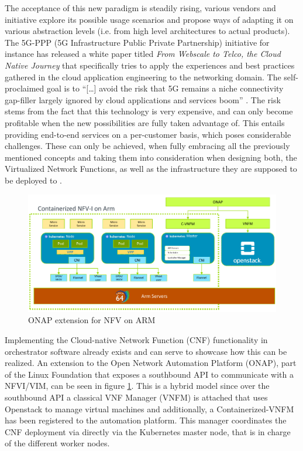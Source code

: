 The acceptance of this new paradigm is steadily rising, various vendors and initiative explore its possible usage scenarios and propose ways of adapting it on various abstraction levels (i.e. from high level architectures to actual products). 
The 5G-PPP (5G Infrastructure Public Private Partnership) initiative for instance has released a white paper titled \textit{From Webscale to Telco, the Cloud Native Journey} \cite{5gppp} that specifically tries to apply the experiences and best practices gathered in the cloud application engineering to the networking domain. The self-proclaimed goal is to ``[\dots] avoid the risk that 5G remains a niche connectivity gap-filler largely ignored by cloud applications and services boom'' \cite{5gppp}. The risk stems from the fact that this technology is very expensive, and can only become profitable when the new possibilities are fully taken advantage of. This entails providing end-to-end services on a per-customer basis, which poses considerable challenges. These can only be achieved, when fully embracing all the previously mentioned concepts and taking them into consideration when designing both, the Virtualized Network Functions, as well as the infrastructure they are supposed to be deployed to \cite{5gppp}.

\begin{figure}[h]
	\includegraphics[width=\linewidth]{images/nfv4arm.png}
	\caption{ONAP extension for NFV on ARM \cite{nfv4arm}}
	\label{fig:nfv4arm}
\end{figure}

Implementing the Cloud-native Network Function (CNF) functionality in orchestrator software already exists and can serve to showcase how this can be realized. An extension to the Open Network Automation Platform (ONAP), part of the Linux Foundation that exposes a southbound API to communicate with a NFVI/VIM, can be seen in figure \ref{fig:nfv4arm}. This is a hybrid model since over the southbound API a classical VNF Manager (VNFM) is attached that uses Openstack to manage virtual machines and additionally, a Containerized-VNFM has been registered to the automation platform. This manager coordinates the CNF deployment via directly via the Kubernetes master node, that is in charge of the different worker nodes.


